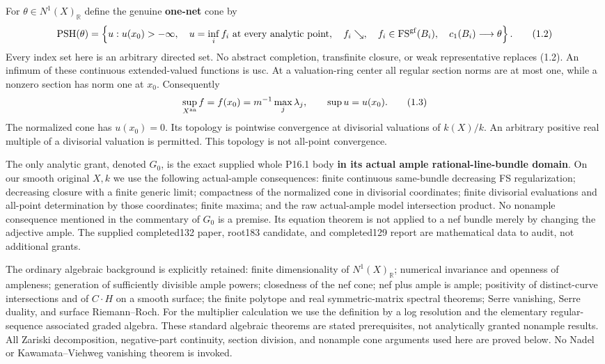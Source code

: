 \documentclass[
  10pt,
]{article}
\begin{document}
For \(\theta\in N^1(X)_{\mathbb R}\) define the genuine \textbf{one-net}
cone by \[
 \operatorname{PSH}(\theta)=\left\{u:
 u(x_0)>-\infty,\quad u=\inf_i f_i\text{ at every analytic point},
 \quad f_i\searrow,\quad f_i\in\operatorname{FS}^{\rm gf}(B_i),
 \quad c_1(B_i)\longrightarrow\theta\right\}.                    \tag{1.2}
\] Every index set here is an arbitrary directed set. No abstract
completion, transfinite closure, or weak representative replaces (1.2).
An infimum of these continuous extended-valued functions is usc. At a
valuation-ring center all regular section norms are at most one, while a
nonzero section has norm one at \(x_0\). Consequently \[
 \sup_{X^{\rm an}} f=f(x_0)=m^{-1}\max_j\lambda_j,
 \qquad \sup u=u(x_0).                                          \tag{1.3}
\] The normalized cone has \(u(x_0)=0\). Its topology is pointwise
convergence at divisorial valuations of \(k(X)/k\). An arbitrary
positive real multiple of a divisorial valuation is permitted. This
topology is not all-point convergence.

The only analytic grant, denoted \(G_0\), is the exact supplied whole
P16.1 body \textbf{in its actual ample rational-line-bundle domain}. On
our smooth original \(X,k\) we use the following actual-ample
consequences: finite continuous same-bundle decreasing FS
regularization; decreasing closure with a finite generic limit;
compactness of the normalized cone in divisorial coordinates; finite
divisorial evaluations and all-point determination by those coordinates;
finite maxima; and the raw actual-ample model intersection product. No
nonample consequence mentioned in the commentary of \(G_0\) is a
premise. Its equation theorem is not applied to a nef bundle merely by
changing the adjective ample. The supplied completed132 paper, root183
candidate, and completed129 report are mathematical data to audit, not
additional grants.

The ordinary algebraic background is explicitly retained: finite
dimensionality of \(N^1(X)_{\mathbb R}\); numerical invariance and
openness of ampleness; generation of sufficiently divisible ample
powers; closedness of the nef cone; nef plus ample is ample; positivity
of distinct-curve intersections and of \(C\cdot H\) on a smooth surface;
the finite polytope and real symmetric-matrix spectral theorems; Serre
vanishing, Serre duality, and surface Riemann--Roch. For the multiplier
calculation we use the definition by a log resolution and the elementary
regular-sequence associated graded algebra. These standard algebraic
theorems are stated prerequisites, not analytically granted nonample
results. All Zariski decomposition, negative-part continuity, section
division, and nonample cone arguments used here are proved below. No
Nadel or Kawamata--Viehweg vanishing theorem is invoked.
\end{document}
